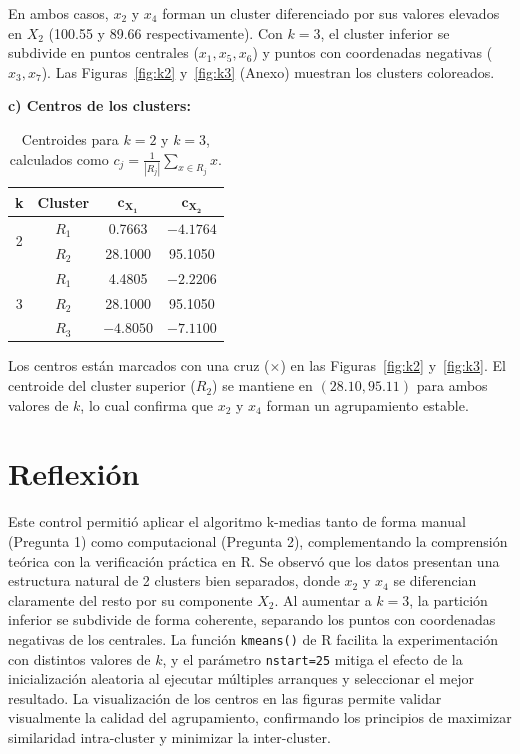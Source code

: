 \documentclass[10pt,a4paper]{article}
\begin{document}
En ambos casos, $x_2$ y $x_4$ forman un cluster diferenciado por sus valores elevados en $X_2$ (100.55 y 89.66 respectivamente). Con $k=3$, el cluster inferior se subdivide en puntos centrales ($x_1, x_5, x_6$) y puntos con coordenadas negativas ($x_3, x_7$). Las Figuras~\ref{fig:k2} y~\ref{fig:k3} (Anexo) muestran los clusters coloreados.

\textbf{c) Centros de los clusters:}

\begin{table}[H]
\centering
\footnotesize
\begin{tabular}{cccc}
\toprule
\textbf{k} & \textbf{Cluster} & $\mathbf{c_{X_1}}$ & $\mathbf{c_{X_2}}$ \\
\midrule
\multirow{2}{*}{2} & $R_1$ & 0.7663 & $-4.1764$ \\
                    & $R_2$ & 28.1000 & 95.1050 \\
\midrule
\multirow{3}{*}{3} & $R_1$ & 4.4805 & $-2.2206$ \\
                    & $R_2$ & 28.1000 & 95.1050 \\
                    & $R_3$ & $-4.8050$ & $-7.1100$ \\
\bottomrule
\end{tabular}
\caption{Centroides para $k=2$ y $k=3$, calculados como $c_j = \frac{1}{|R_j|}\sum_{x \in R_j} x$.}
\label{tab:centros}
\end{table}

Los centros est\'an marcados con una cruz ($\times$) en las Figuras~\ref{fig:k2} y~\ref{fig:k3}. El centroide del cluster superior ($R_2$) se mantiene en $(28.10, 95.11)$ para ambos valores de $k$, lo cual confirma que $x_2$ y $x_4$ forman un agrupamiento estable.

\section{Reflexi\'on}

Este control permiti\'o aplicar el algoritmo k-medias tanto de forma manual (Pregunta 1) como computacional (Pregunta 2), complementando la comprensi\'on te\'orica con la verificaci\'on pr\'actica en R. Se observ\'o que los datos presentan una estructura natural de 2 clusters bien separados, donde $x_2$ y $x_4$ se diferencian claramente del resto por su componente $X_2$. Al aumentar a $k=3$, la partici\'on inferior se subdivide de forma coherente, separando los puntos con coordenadas negativas de los centrales. La funci\'on \texttt{kmeans()} de R facilita la experimentaci\'on con distintos valores de $k$, y el par\'ametro \texttt{nstart=25} mitiga el efecto de la inicializaci\'on aleatoria al ejecutar m\'ultiples arranques y seleccionar el mejor resultado. La visualizaci\'on de los centros en las figuras permite validar visualmente la calidad del agrupamiento, confirmando los principios de maximizar similaridad intra-cluster y minimizar la inter-cluster.
\end{document}
